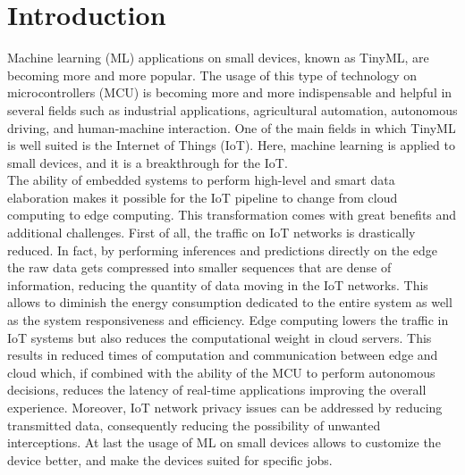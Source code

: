 \documentclass[12pt]{report}
\newcommand{\mychapter}[2]{
    \setcounter{chapter}{#1}
    \setcounter{section}{0}
    \chapter*{#2}
    \addcontentsline{toc}{chapter}{#2}
    }
\newcommand\blankpage{%
    \null
    \thispagestyle{empty}%
    \addtocounter{page}{0}%
    \newpage}
\begin{document}
\begin{figure}
 \centering 
 
\end{figure}

\afterpage{\blankpage}

\tableofcontents
\listoffigures
\listoftables
\afterpage{\blankpage}




\mychapter{0}{Introduction}

\label{intro}
Machine learning (ML) applications on small devices, known as TinyML, are becoming more and more popular. The usage of this type of technology on microcontrollers (MCU) is becoming more and more indispensable and helpful in several fields such as industrial applications, agricultural automation, autonomous driving, and human-machine interaction. One of the main fields in which TinyML is well suited is the Internet of Things (IoT). Here, machine learning is applied to small devices, and it is a breakthrough for the IoT.\\
The ability of embedded systems to perform high-level and smart data elaboration makes it possible for the IoT pipeline to change from cloud computing to edge computing. This transformation comes with great benefits and additional challenges.
First of all, the traffic on IoT networks is drastically reduced. In fact, by performing inferences and predictions directly on the edge the raw data gets compressed into smaller sequences that are dense of information, reducing the quantity of data moving in the IoT networks. This allows to diminish the energy consumption dedicated to the entire system as well as the system responsiveness and efficiency.
Edge computing lowers the traffic in IoT systems but also reduces the computational weight in cloud servers. This results in reduced times of computation and communication between edge and cloud which, if combined with the ability of the MCU to perform autonomous decisions, reduces the latency of real-time applications improving the overall experience.
Moreover, IoT network privacy issues can be addressed by reducing transmitted data, consequently reducing the possibility of unwanted interceptions.
At last the usage of ML on small devices allows to customize the device better, and make the devices suited for specific jobs. \\
\end{document}
